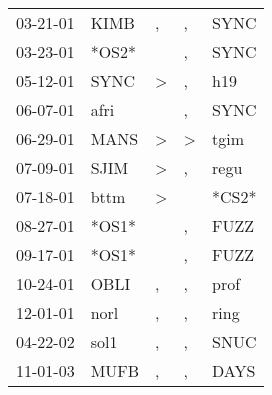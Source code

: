 \begin{supertabular}{p{0.07\textwidth}p{0.06\textwidth}p{0.02\textwidth}p{0.02\textwidth}p{0.06\textwidth}}
 03-21-01\textsuperscript{} &  KIMB\textsuperscript{} &                , &             , &           SYNC\textsuperscript{} \\
 03-23-01\textsuperscript{} &                   *OS2* &                  &             , &           SYNC\textsuperscript{} \\
 05-12-01\textsuperscript{} &  SYNC\textsuperscript{} &     \textgreater &             , &            h19\textsuperscript{} \\
 06-07-01\textsuperscript{} &  afri\textsuperscript{} &                  &             , &           SYNC\textsuperscript{} \\
 06-29-01\textsuperscript{} &  MANS\textsuperscript{} &     \textgreater &  \textgreater &           tgim\textsuperscript{} \\
 07-09-01\textsuperscript{} &  SJIM\textsuperscript{} &     \textgreater &             , &           regu\textsuperscript{} \\
 07-18-01\textsuperscript{} &  bttm\textsuperscript{} &     \textgreater &               &                            *CS2* \\
 08-27-01\textsuperscript{} &                   *OS1* &                  &             , &           FUZZ\textsuperscript{} \\
 09-17-01\textsuperscript{} &                   *OS1* &                  &             , &           FUZZ\textsuperscript{} \\
 10-24-01\textsuperscript{} &  OBLI\textsuperscript{} &                , &             , &           prof\textsuperscript{} \\
 12-01-01\textsuperscript{} &  norl\textsuperscript{} &                , &             , &           ring\textsuperscript{} \\
 04-22-02\textsuperscript{} &  sol1\textsuperscript{} &                , &             , &           SNUC\textsuperscript{} \\
 11-01-03\textsuperscript{} &  MUFB\textsuperscript{} &                , &             , &           DAYS\textsuperscript{} \\
\end{supertabular}
